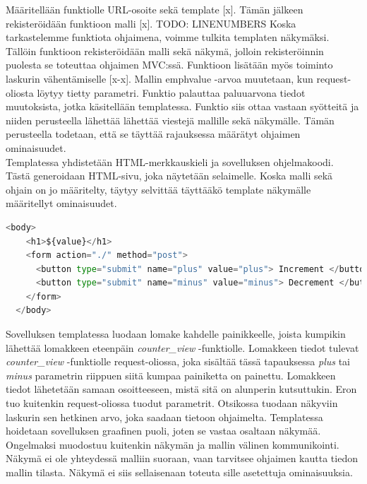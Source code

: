 \documentclass[finnish,utf8,nonumbib,palatino,kandi]{gradu2}
\begin{document}
Määritellään funktiolle URL-osoite sekä template [x]. Tämän jälkeen rekisteröidään funktioon malli [x]. TODO: LINENUMBERS Koska tarkastelemme funktiota ohjaimena, voimme tulkita templaten näkymäksi. Tällöin funktioon rekisteröidään malli sekä näkymä, jolloin rekisteröinnin puolesta se toteuttaa ohjaimen MVC:ssä. 
Funktioon lisätään myös toiminto laskurin vähentämiselle [x-x]. Mallin emph{value} -arvoa muutetaan, kun request-oliosta löytyy tietty parametri. Funktio palauttaa paluuarvona tiedot muutoksista, jotka käsitellään templatessa. Funktio siis ottaa vastaan syötteitä ja niiden perusteella lähettää lähettää viestejä
mallille sekä näkymälle. Tämän perusteella todetaan, että se täyttää rajauksessa määrätyt ohjaimen ominaisuudet. \\

Templatessa yhdistetään HTML-merkkauskieli ja sovelluksen ohjelmakoodi. Tästä generoidaan HTML-sivu, joka näytetään selaimelle. Koska malli sekä ohjain on jo määritelty, täytyy selvittää täyttääkö template näkymälle määritellyt ominaisuudet.  
\begin{lstlisting}[language=Python]      
  <body>                                                                        
    <h1>${value}</h1>                                                           
    <form action="./" method="post">                                            
      <button type="submit" name="plus" value="plus"> Increment </button>       
      <button type="submit" name="minus" value="minus"> Decrement </button>     
    </form>                                                                     
  </body>  
\end{lstlisting} 
Sovelluksen templatessa luodaan lomake kahdelle painikkeelle, joista kumpikin lähettää lomakkeen eteenpäin \emph{counter\_view} -funktiolle. Lomakkeen tiedot tulevat \emph{counter\_view} -funktiolle request-oliossa, joka sisältää tässä tapauksessa \emph{plus} tai \emph{minus} parametrin riippuen siitä kumpaa painiketta on painettu. Lomakkeen tiedot lähetetään samaan osoitteeseen, mistä sitä on alunperin kutsuttukin. Eron tuo kuitenkin request-oliossa tuodut parametrit.  Otsikossa tuodaan näkyviin laskurin sen hetkinen arvo, joka saadaan tietoon ohjaimelta.
 Templatessa hoidetaan sovelluksen graafinen puoli, joten se vastaa osaltaan näkymää. \\ Ongelmaksi muodostuu kuitenkin näkymän ja mallin välinen kommunikointi. Näkymä ei ole yhteydessä malliin suoraan, vaan tarvitsee ohjaimen kautta tiedon mallin tilasta.  Näkymä ei siis sellaisenaan toteuta sille asetettuja ominaisuuksia. 
\end{document}
